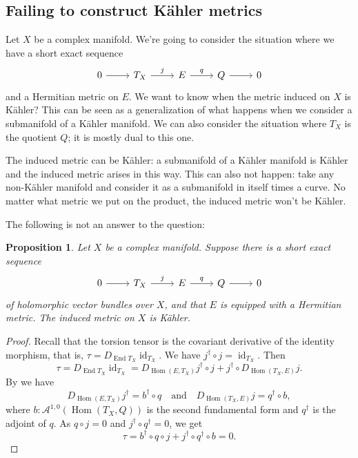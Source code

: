 \documentclass[10pt,a4paper]{article}
\newtheorem{prop}[theo]{Proposition}
\newtheorem*{proof}{Proof}
\newcommand{\cc}[1]{\mathcal{#1}}
\def\qandq{\quad\text{and}\quad}
\DeclareMathOperator{\End}{End}
\DeclareMathOperator{\Hom}{Hom}
\DeclareMathOperator{\id}{id}
\begin{document}
\subsection{Failing to construct K\"ahler metrics}


Let $X$ be a complex manifold. We're going to consider the situation where we have a short exact sequence
\[
\begin{tikzcd}
0 \arrow[r] & T_X \arrow[r,"j"] & E \arrow[r,"q"] & Q \arrow[r] & 0
\end{tikzcd}
\]
and a Hermitian metric on $E$. We want to know when the metric induced on $X$ is K\"ahler? This can be seen as a generalization of what happens when we consider a submanifold of a K\"ahler manifold. We can also consider the situation where $T_X$ is the quotient $Q$; it is mostly dual to this one.

The induced metric can be K\"ahler: a submanifold of a K\"ahler manifold is K\"ahler and the induced metric arises in this way. This can also not happen: take any non-K\"ahler manifold and consider it as a submanifold in itself times a curve. No matter what metric we put on the product, the induced metric won't be K\"ahler.

The following is not an answer to the question:



\begin{prop}
Let $X$ be a complex manifold. Suppose there is a short exact sequence
\[
\begin{tikzcd}
0 \arrow[r] & T_X \arrow[r,"j"] & E \arrow[r,"q"] & Q \arrow[r] & 0
\end{tikzcd}
\]
of holomorphic vector bundles over $X$, and that $E$ is equipped with a Hermitian metric. The induced metric on $X$ is K\"ahler.
\end{prop}

\begin{proof}
Recall that the torsion tensor is the covariant derivative of the identity morphism, that is, $\tau = D_{\End T_X} \id_{T_X}$.
We have $j^\dagger \circ j = \id_{T_X}$. Then
\[
\tau
= D_{\End T_X} \id_{T_X}
= D_{\Hom(E,T_X)}j^\dagger \circ j + j^\dagger \circ D_{\Hom(T_X,E)}j.
\]
By  we have
\[
D_{\Hom(E,T_X)}j^\dagger
= b^\dagger \circ q
\qandq
D_{\Hom(T_X,E)}j
= q^\dagger \circ b,
\]
where $b : \cc A^{1,0}(\Hom(T_X,Q))$ is the second fundamental form and $q^\dagger$ is the adjoint of $q$.
As $q \circ j = 0$ and $j^\dagger \circ q^\dagger = 0$, we get
\[
\tau
= b^\dagger \circ q \circ j
+ j^\dagger \circ q^\dagger \circ b
= 0.
\]
\end{proof}
\end{document}
